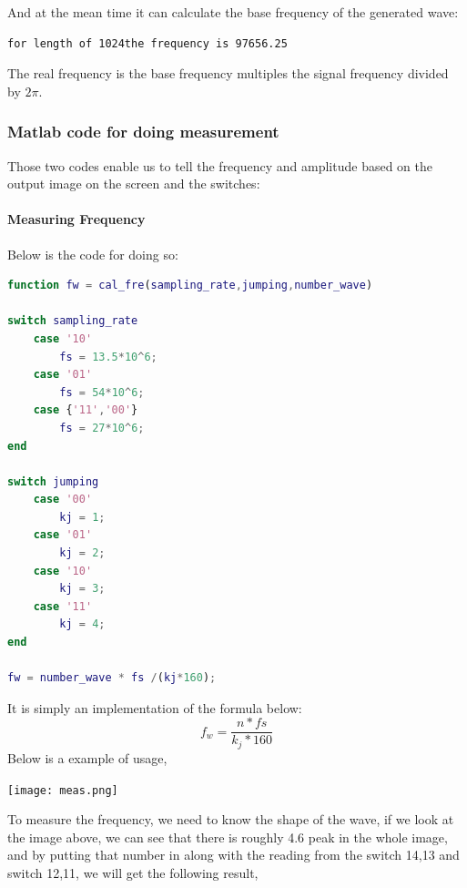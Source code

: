 \documentclass[11pt]{scrartcl}
\begin{document}
And at the mean time it can calculate the base frequency of the generated wave:
\begin{verbatim}
for length of 1024the frequency is 97656.25
\end{verbatim}

The real frequency is the base frequency multiples the signal frequency divided by $2\pi$.


\subsubsection{Matlab code for doing measurement}

Those two codes enable us to tell the frequency and amplitude based on the output image on the screen and the switches:
\paragraph{Measuring Frequency}

Below is the code for doing so:

\begin{lstlisting}[language=Matlab]
function fw = cal_fre(sampling_rate,jumping,number_wave)

switch sampling_rate
    case '10'
        fs = 13.5*10^6;
    case '01'
        fs = 54*10^6;
    case {'11','00'}
        fs = 27*10^6;
end

switch jumping
    case '00'
        kj = 1;
    case '01'
        kj = 2;
    case '10'
        kj = 3;
    case '11'
        kj = 4;
end

fw = number_wave * fs /(kj*160);
\end{lstlisting}

It is simply an implementation of the formula below:
$$ f_w = \frac{n*fs}{k_j*160}$$
Below is a example of usage,
\begin{center}
\begin{minipage}[t]{\linewidth}

{
\texttt{[image: meas.png]}
}
\end{minipage}
\medskip
\end{center}

To measure the frequency, we need to know the shape of the wave, if we look at the image above, we can see that there is roughly 4.6 peak in the whole image, and by putting that number in along with the reading from the switch 14,13 and switch 12,11, we will get the following result,
\end{document}
